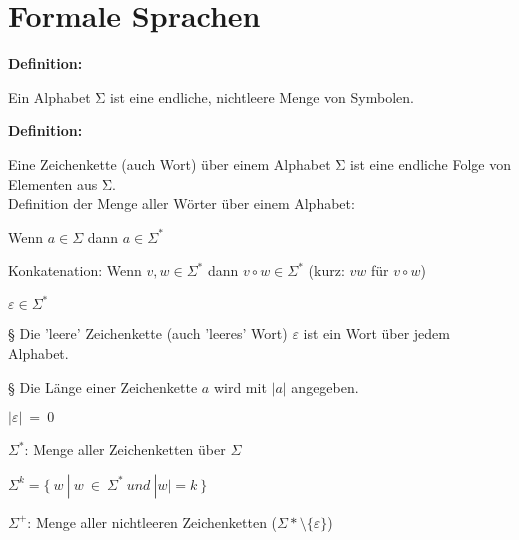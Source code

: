 \documentclass[11pt,
			a4paper,
			parskip=full,
			toc=bib,
			toc=idx,
			toc=listof,
			ngerman
			listof=totoc,]{scrartcl}
\newcommand{\concept}[1]{%
	\sf{%
		\textbf{%
				\textcolor{mymauve}{#1}%
		}%
	}%
	\rm%
}
\newenvironment{objDef}[1]%
{	\begin{framed}
	\textbf{Definition:} \concept{#1}
	\compress}%
{\end{framed}}
\newenvironment{cmt}%
{\color{mygray} § }
{\color{black}}
\newcommand{\compress}{\vspace{-1em}}
\begin{document}
\pagestyle{scrheadings}
\ihead{}
\chead{}
\ohead{\pagemark}
\cfoot{}


\newpage
\section{Formale Sprachen}
\compress
\begin{objDef}{Alphabet}

Ein Alphabet Σ ist eine endliche, nichtleere Menge von Symbolen.
\end{objDef}

\compress

\compress
\begin{objDef}{Zeichenkette}

Eine Zeichenkette (auch Wort) über einem Alphabet Σ ist eine endliche
Folge von Elementen aus Σ.\\
Definition der Menge aller Wörter über einem Alphabet:
\compress
\begin{compactenum}
  \item Wenn $a  ∈  Σ$ dann $a ∈  Σ^*$
  \item Konkatenation: Wenn $v,w  ∈  Σ^*$ dann $v∘w  ∈  Σ^*$ (kurz: $vw$ für $v∘w$)
  \item $ε ∈ Σ^*$
\end{compactenum}
\end{objDef}

\compress
\compress
\begin{cmt}
Die 'leere' Zeichenkette (auch 'leeres' Wort) $ε$ ist ein Wort über jedem Alphabet.
\end{cmt}

\compress
\begin{cmt}
Die Länge einer Zeichenkette $a$ wird mit $|a|$ angegeben.
\compress
\begin{compactitem}
  \item $|ε| ~ = ~ 0$
  \item $ Σ^* $: Menge aller Zeichenketten über $Σ $
  \item $ Σ^k = \{ ~ w ~ | ~ w  ~ ∈  ~ Σ^*  ~ und  ~ |w| = k ~ \} $
  \item $ Σ^+$: Menge aller nichtleeren Zeichenketten ($Σ* \setminus \{ε\} $)
\end{compactitem}
\end{cmt}
\end{document}
